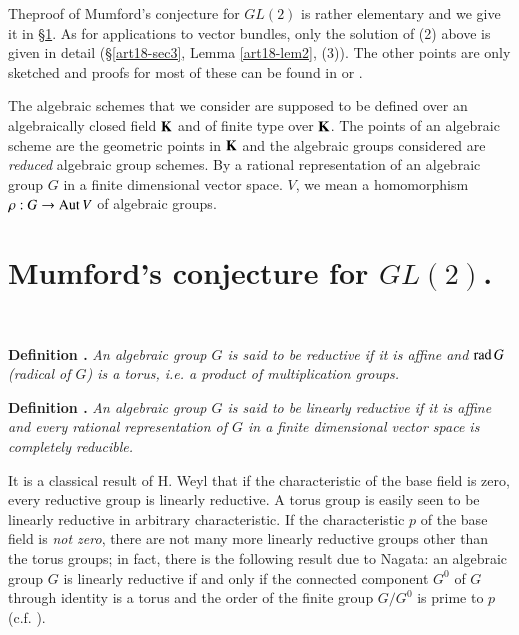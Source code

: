 The\pageoriginale proof of Mumford's conjecture for $GL(2)$ is rather elementary and we give it in \S\ref{art18-sec1}. As for applications to vector bundles, only the solution of (2) above is given in detail (\S\ref{art18-sec3}, Lemma \ref{art18-lem2}, (3)). The other points are only sketched and proofs for most of these can be found in \cite{art18-key5} or \cite{art18-key12}.

The algebraic schemes that we consider are supposed to be defined over an algebraically closed field $\mathbf{K}$ and of finite type over $\mathbf{K}$. The points of an algebraic scheme are the geometric points in $\mathbf{K}$ and the algebraic groups considered are {\em reduced} algebraic group schemes. By a rational representation of an algebraic group $G$ in a finite dimensional vector space. $V$, we mean a homomorphism $\rho:G\to \operatorname{\mathrm{Aut}} V$ of algebraic groups.

\section{Mumford's conjecture for \texorpdfstring{$GL(2)$}{GL2}.}\label{art18-sec1}

~

\medskip

\noindent
{\bf Definition .\label{art18-defi1}}
{\em An algebraic group $G$ is said to be reductive if it is affine and $\operatorname{\mathrm{rad}} G$ (radical of $G$) is a torus, i.e. a product of multiplication groups.}

\medskip
\noindent
{\bf Definition .\label{art18-defi2}}
{\em An algebraic group $G$ is said to be linearly reductive if it is affine and every rational representation of $G$ in a finite dimensional vector space is completely reducible.}
\smallskip

It is a classical result of H. Weyl that if the characteristic of the base field is zero, every reductive group is linearly reductive. A torus group is easily seen to be linearly reductive in arbitrary characteristic. If the characteristic $p$ of the base field is {\em not zero}, there are not many more linearly reductive groups other than the torus groups; in fact, there is the following result due to Nagata: an algebraic group $G$ is linearly reductive if and only if the connected component $G^{0}$ of $G$ through identity is a torus and the order of the finite group $G/G^{0}$ is prime to $p$ (c.f. \cite{art18-key6}).

